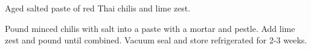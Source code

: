 \documentclass[main]{subfiles}
\begin{document}
Aged salted paste of red Thai chilis and lime zest.

\begin{rec}
Pound minced chilis with salt into a paste with a mortar and pestle.
Add lime zest and pound until combined.
\newstep
Vacuum seal and store refrigerated for 2-3 weeks.
\end{rec}
\end{document}
